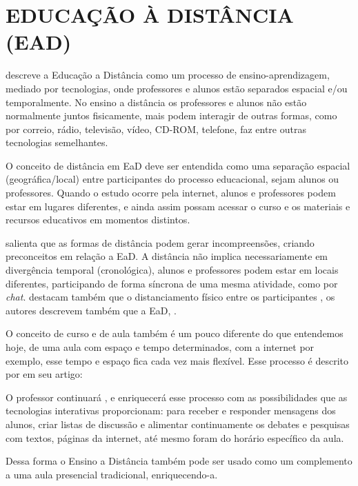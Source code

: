 \section{EDUCAÇÃO À DISTÂNCIA (EAD)}

 descreve a Educação a Distância como um processo de ensino-aprendizagem, mediado por tecnologias, onde professores e alunos estão separados espacial e/ou temporalmente. No ensino a distância os professores e alunos não estão normalmente juntos fisicamente, mais podem interagir de outras formas, como por correio, rádio, televisão, vídeo, CD-ROM, telefone, faz entre outras tecnologias semelhantes.

O conceito de distância em EaD deve ser entendida como uma separação espacial (geográfica/local) entre participantes do processo educacional, sejam alunos ou professores. Quando o estudo ocorre pela internet, alunos e professores podem estar em lugares diferentes, e ainda assim possam acessar o curso e os materiais e recursos educativos em momentos distintos.

 salienta que as formas de distância podem gerar incompreensões, criando preconceitos em relação a EaD. A distância não implica necessariamente em divergência temporal (cronológica), alunos e professores podem estar em locais diferentes, participando de forma síncrona de uma mesma atividade, como por \textit{chat}.   destacam também que o distanciamento físico entre os participantes , os autores descrevem também que a EaD,  .

O conceito de curso e de aula também é um pouco diferente do que entendemos hoje, de uma aula com espaço e tempo determinados, com a internet por exemplo, esse tempo e espaço fica cada vez mais flexível. Esse processo é descrito por  em seu artigo:
\begin{citacao}
  O professor continuará , e enriquecerá esse processo com as possibilidades que as tecnologias interativas proporcionam: para receber e responder mensagens dos alunos, criar listas de discussão e alimentar continuamente os debates e pesquisas com textos, páginas da internet, até mesmo foram do horário específico da aula.
\end{citacao}

Dessa forma o Ensino a Distância também pode ser usado como um complemento a uma aula presencial tradicional, enriquecendo-a.


